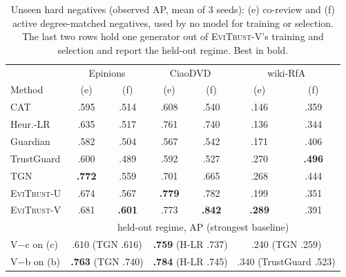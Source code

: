 \documentclass[conference]{IEEEtran}
\newcommand{\eviU}{\textsc{EviTrust}-U}
\newcommand{\eviV}{\textsc{EviTrust}-V}
\begin{document}
\begin{table}[t]
\centering
\caption{Unseen hard negatives (observed AP, mean of 3 seeds): (e) co-review and (f) active degree-matched negatives, used by no model for training or selection. The last two rows hold one generator out of \eviV{}'s training and selection and report the held-out regime. Best in bold.}
\label{tab:unseen}
\setlength{\tabcolsep}{2.2pt}
\begin{tabular}{l|cc|cc|cc}
\toprule
& \multicolumn{2}{c|}{Epinions} & \multicolumn{2}{c|}{CiaoDVD} & \multicolumn{2}{c}{wiki-RfA} \\
Method & (e) & (f) & (e) & (f) & (e) & (f) \\
\midrule
CAT & .595 & .514 & .608 & .540 & .146 & .359 \\
Heur.-LR & .635 & .517 & .761 & .740 & .136 & .344 \\
Guardian & .582 & .504 & .567 & .542 & .171 & .406 \\
TrustGuard & .600 & .489 & .592 & .527 & .270 & \textbf{.496} \\
TGN & \textbf{.772} & .559 & .701 & .665 & .268 & .444 \\
\midrule
\eviU{} & .674 & .567 & \textbf{.779} & .782 & .199 & .351 \\
\eviV{} & .681 & \textbf{.601} & .773 & \textbf{.842} & \textbf{.289} & .391 \\
\midrule
& \multicolumn{6}{c}{held-out regime, AP (strongest baseline)} \\
V$-$c on (c) & \multicolumn{2}{c|}{.610 (TGN .616)} & \multicolumn{2}{c|}{\textbf{.759} (H-LR .737)} & \multicolumn{2}{c}{.240 (TGN .259)} \\
V$-$b on (b) & \multicolumn{2}{c|}{\textbf{.763} (TGN .740)} & \multicolumn{2}{c|}{\textbf{.784} (H-LR .745)} & \multicolumn{2}{c}{.340 (TrustGuard .523)} \\
\bottomrule
\end{tabular}
\end{table}
\end{document}
